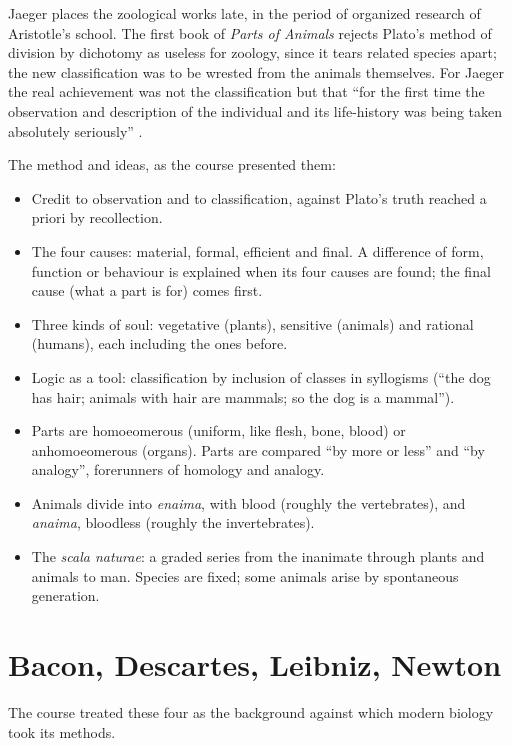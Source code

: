 Jaeger places the zoological works late, in
the period of organized research of
Aristotle's school. The first book of
\emph{Parts of Animals} rejects Plato's
method of division by dichotomy as useless
for zoology, since it tears related species
apart; the new classification was to be
wrested from the animals themselves. For
Jaeger the real achievement was not the
classification but that ``for the first
time the observation and description of the
individual and its life-history was being
taken absolutely seriously''
\cite[Chapter XIII]{jaeger1948aristotle}.

The method and ideas, as the course
presented them:
\begin{itemize}
\item Credit to observation and to
classification, against Plato's truth
reached a priori by recollection.
\item The four causes: material, formal,
efficient and final. A difference of form,
function or behaviour is explained when its
four causes are found; the final cause
(what a part is for) comes first.
\item Three kinds of soul: vegetative
(plants), sensitive (animals) and rational
(humans), each including the ones before.
\item Logic as a tool: classification by
inclusion of classes in syllogisms (``the
dog has hair; animals with hair are
mammals; so the dog is a mammal'').
\item Parts are homoeomerous (uniform, like
flesh, bone, blood) or anhomoeomerous
(organs). Parts are compared ``by more or
less'' and ``by analogy'', forerunners of
homology and analogy.
\item Animals divide into \emph{enaima},
with blood (roughly the vertebrates), and
\emph{anaima}, bloodless (roughly the
invertebrates).
\item The \emph{scala naturae}: a graded
series from the inanimate through plants
and animals to man. Species are fixed;
some animals arise by spontaneous
generation.
\end{itemize}

\section{Bacon, Descartes, Leibniz, Newton}
\label{section-early-modern}

The course treated these four as the
background against which modern biology
took its methods.

